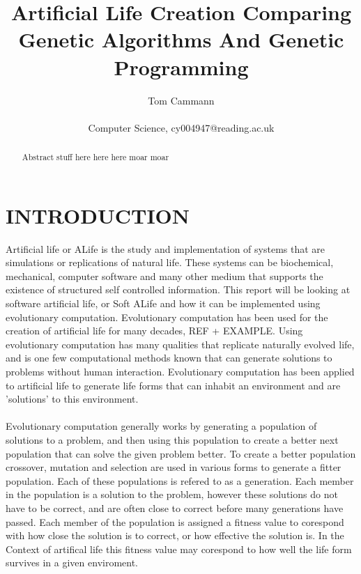 \documentclass[10pt,twocolumn]{article}
\begin{document}
\title{Artificial Life Creation Comparing Genetic Algorithms And Genetic Programming}
\author{Tom Cammann\\\\
Computer Science, cy004947@reading.ac.uk}
\date{}
\maketitle
\begin{abstract}

	Abstract stuff here here here
	moar
	moar
\end{abstract}


\section{INTRODUCTION}

Artificial life or ALife is the study and implementation of systems that are simulations or replications of natural life.
These systems can be biochemical, mechanical, computer software and many other medium that supports the existence of structured self controlled information.
This report will be looking at software artificial life, or Soft ALife and how it can be implemented using evolutionary computation.
Evolutionary computation has been used for the creation of artificial life for many decades, REF + EXAMPLE.
Using evolutionary computation has many qualities that replicate naturally evolved life, and is one few computational methods known that can generate solutions to problems without human interaction.
Evolutionary computation has been applied to artificial life to generate life forms that can inhabit an environment and are 'solutions' to this environment.

\paragraph{}
Evolutionary computation generally works by generating a population of solutions to a problem, and then using this population to create a better next population that can solve the given problem better.
To create a better population crossover, mutation and selection are used in various forms to generate a fitter population.
Each of these populations is refered to as a generation.
Each member in the population is a solution to the problem, however these solutions do not have to be correct, and are often close to correct before many generations have passed.
Each member of the population is assigned a fitness value to corespond with how close the solution is to correct, or how effective the solution is.
In the Context of artifical life this fitness value may corespond to how well the life form survives in a given enviroment.
\end{document}
